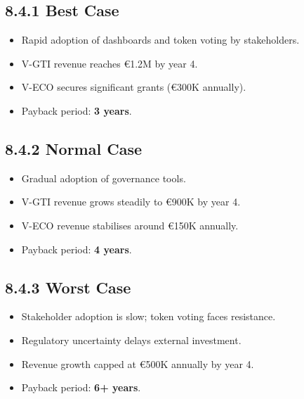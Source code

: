 \documentclass[
  english,
  12pt,
  oneside,
  open=any]{scrbook}
\providecommand{\tightlist}{%
  \setlength{\itemsep}{0pt}\setlength{\parskip}{0pt}}\usepackage{longtable,booktabs,array}
\begin{document}
\subsection{8.4.1 Best Case}\label{sec-best}

\begin{itemize}
\tightlist
\item
  Rapid adoption of dashboards and token voting by stakeholders.\\
\item
  V-GTI revenue reaches €1.2M by year 4.\\
\item
  V-ECO secures significant grants (€300K annually).\\
\item
  Payback period: \textbf{3 years}.
\end{itemize}

\subsection{8.4.2 Normal Case}\label{sec-normal}

\begin{itemize}
\tightlist
\item
  Gradual adoption of governance tools.\\
\item
  V-GTI revenue grows steadily to €900K by year 4.\\
\item
  V-ECO revenue stabilises around €150K annually.\\
\item
  Payback period: \textbf{4 years}.
\end{itemize}

\subsection{8.4.3 Worst Case}\label{sec-worst}

\begin{itemize}
\tightlist
\item
  Stakeholder adoption is slow; token voting faces resistance.\\
\item
  Regulatory uncertainty delays external investment.\\
\item
  Revenue growth capped at €500K annually by year 4.\\
\item
  Payback period: \textbf{6+ years}.
\end{itemize}
\end{document}
